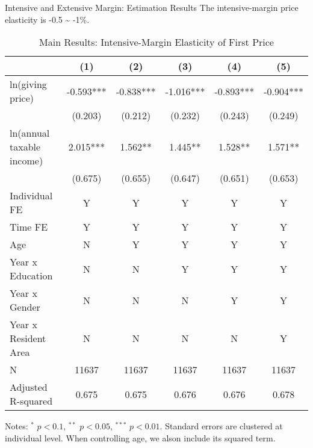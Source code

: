 \documentclass[
  ignorenonframetext,
  aspectratio=169,
]{beamer}
\begin{document}
\begin{frame}{Intensive and Extensive Margin: Estimation Results}
\protect\hypertarget{intensive-and-extensive-margin-estimation-results}{}
The intensive-margin price elasticity is -0.5 \textasciitilde{} -1\%.

\begin{table}

\caption{\label{tab:MainIntensive}Main Results: Intensive-Margin Elasticity of First Price}
\centering
\fontsize{7}{9}\selectfont
\begin{threeparttable}
\begin{tabular}[t]{lccccc}
\toprule
 & (1) & (2) & (3) & (4) & (5)\\
\midrule
ln(giving price) & -0.593*** & -0.838*** & -1.016*** & -0.893*** & -0.904***\\
 & (0.203) & (0.212) & (0.232) & (0.243) & (0.249)\\
ln(annual taxable income) & 2.015*** & 1.562** & 1.445** & 1.528** & 1.571**\\
 & (0.675) & (0.655) & (0.647) & (0.651) & (0.653)\\
Individual FE & Y & Y & Y & Y & Y\\
Time FE & Y & Y & Y & Y & Y\\
Age & N & Y & Y & Y & Y\\
Year x Education & N & N & Y & Y & Y\\
Year x Gender & N & N & N & Y & Y\\
Year x Resident Area & N & N & N & N & Y\\
N & 11637 & 11637 & 11637 & 11637 & 11637\\
Adjusted R-squared & 0.675 & 0.675 & 0.676 & 0.676 & 0.678\\
\bottomrule
\end{tabular}
\begin{tablenotes}
\item Notes: $^{*}$ $p < 0.1$, $^{**}$ $p < 0.05$, $^{***}$ $p < 0.01$. Standard errors are clustered at individual level. When controlling age, we alson include its squared term.
\end{tablenotes}
\end{threeparttable}
\end{table}
\end{frame}
\end{document}
